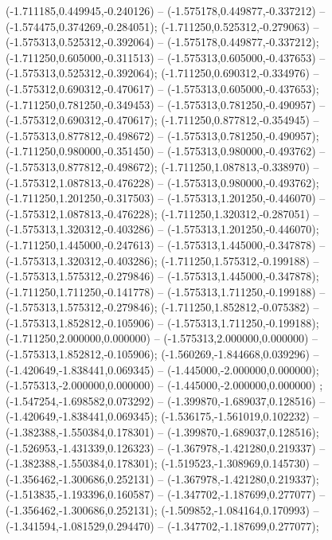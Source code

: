  (-1.711185,0.449945,-0.240126) -- (-1.575178,0.449877,-0.337212) -- (-1.574475,0.374269,-0.284051);
 (-1.711250,0.525312,-0.279063) -- (-1.575313,0.525312,-0.392064) -- (-1.575178,0.449877,-0.337212);
 (-1.711250,0.605000,-0.311513) -- (-1.575313,0.605000,-0.437653) -- (-1.575313,0.525312,-0.392064);
 (-1.711250,0.690312,-0.334976) -- (-1.575312,0.690312,-0.470617) -- (-1.575313,0.605000,-0.437653);
 (-1.711250,0.781250,-0.349453) -- (-1.575313,0.781250,-0.490957) -- (-1.575312,0.690312,-0.470617);
 (-1.711250,0.877812,-0.354945) -- (-1.575313,0.877812,-0.498672) -- (-1.575313,0.781250,-0.490957);
 (-1.711250,0.980000,-0.351450) -- (-1.575313,0.980000,-0.493762) -- (-1.575313,0.877812,-0.498672);
 (-1.711250,1.087813,-0.338970) -- (-1.575312,1.087813,-0.476228) -- (-1.575313,0.980000,-0.493762);
 (-1.711250,1.201250,-0.317503) -- (-1.575313,1.201250,-0.446070) -- (-1.575312,1.087813,-0.476228);
 (-1.711250,1.320312,-0.287051) -- (-1.575313,1.320312,-0.403286) -- (-1.575313,1.201250,-0.446070);
 (-1.711250,1.445000,-0.247613) -- (-1.575313,1.445000,-0.347878) -- (-1.575313,1.320312,-0.403286);
 (-1.711250,1.575312,-0.199188) -- (-1.575313,1.575312,-0.279846) -- (-1.575313,1.445000,-0.347878);
 (-1.711250,1.711250,-0.141778) -- (-1.575313,1.711250,-0.199188) -- (-1.575313,1.575312,-0.279846);
 (-1.711250,1.852812,-0.075382) -- (-1.575313,1.852812,-0.105906) -- (-1.575313,1.711250,-0.199188);
 (-1.711250,2.000000,0.000000) -- (-1.575313,2.000000,0.000000) -- (-1.575313,1.852812,-0.105906);
 (-1.560269,-1.844668,0.039296) -- (-1.420649,-1.838441,0.069345) -- (-1.445000,-2.000000,0.000000);
 (-1.575313,-2.000000,0.000000) -- (-1.445000,-2.000000,0.000000) ;
 (-1.547254,-1.698582,0.073292) -- (-1.399870,-1.689037,0.128516) -- (-1.420649,-1.838441,0.069345);
 (-1.536175,-1.561019,0.102232) -- (-1.382388,-1.550384,0.178301) -- (-1.399870,-1.689037,0.128516);
 (-1.526953,-1.431339,0.126323) -- (-1.367978,-1.421280,0.219337) -- (-1.382388,-1.550384,0.178301);
 (-1.519523,-1.308969,0.145730) -- (-1.356462,-1.300686,0.252131) -- (-1.367978,-1.421280,0.219337);
 (-1.513835,-1.193396,0.160587) -- (-1.347702,-1.187699,0.277077) -- (-1.356462,-1.300686,0.252131);
 (-1.509852,-1.084164,0.170993) -- (-1.341594,-1.081529,0.294470) -- (-1.347702,-1.187699,0.277077);
